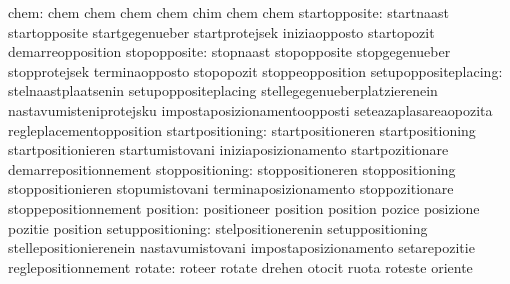                             chem: chem                             chem
                                  chem                             chem
                                  chim                             chem
                                  chem
                   startopposite: startnaast                       startopposite
                                  startgegenueber                  startprotejsek
                                  iniziaopposto                    startopozit
                                  demarreopposition
                    stopopposite: stopnaast                        stopopposite
                                  stopgegenueber                   stopprotejsek
                                  terminaopposto                   stopopozit
                                  stoppeopposition
            setupoppositeplacing: stelnaastplaatsenin              setupoppositeplacing
                                  stellegegenueberplatzierenein    nastavumisteniprotejsku
                                  impostaposizionamentoopposti     seteazaplasareaopozita
                                  regleplacementopposition
                startpositioning: startpositioneren                startpositioning
                                  startpositionieren               startumistovani
                                  iniziaposizionamento             startpozitionare
                                  demarrepositionnement
                 stoppositioning: stoppositioneren                 stoppositioning
                                  stoppositionieren                stopumistovani
                                  terminaposizionamento            stoppozitionare
                                  stoppepositionnement
                        position: positioneer                      position
                                  position                         pozice
                                  posizione                        pozitie
                                  position
                setuppositioning: stelpositionerenin               setuppositioning
                                  stellepositionierenein           nastavumistovani
                                  impostaposizionamento            setarepozitie
                                  reglepositionnement
                          rotate: roteer                           rotate
                                  drehen                           otocit
                                  ruota                            roteste
                                  oriente
